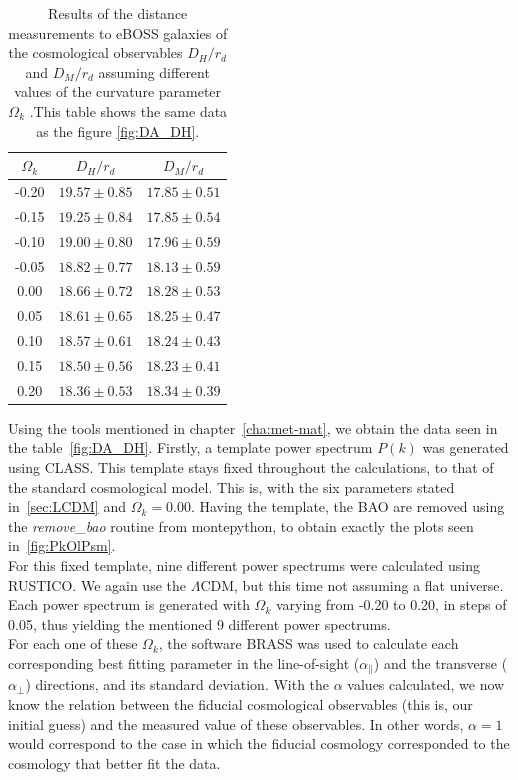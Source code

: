 \begin{table}
	\begin{center}
\begin{tabular}{|c|c|c|}
	\hline
$\Omega_k$ & $D_H/r_d$ & $D_M/r_d$ \\
\hline
-0.20 & $19.57 \pm 0.85$ & $17.85 \pm 0.51$ \\
-0.15 & $19.25 \pm 0.84$ & $17.85 \pm 0.54$ \\
-0.10& $19.00 \pm 0.80$ & $17.96 \pm 0.59$ \\
-0.05 & $18.82 \pm 0.77$ & $18.13 \pm 0.59$ \\
0.00 & $18.66 \pm 0.72$ & $18.28 \pm 0.53$ \\
0.05 & $18.61 \pm 0.65$ & $18.25 \pm 0.47$ \\
0.10 & $18.57 \pm 0.61$ & $18.24 \pm 0.43$ \\
0.15 & $18.50\pm 0.56$ & $18.23 \pm 0.41$ \\
0.20 & $18.36 \pm 0.53$ & $18.34 \pm 0.39$ \\
\hline
\end{tabular}
\end{center}
\caption{Results of the distance measurements to eBOSS galaxies of the cosmological observables $D_H /r_d$ and $D_M /r_d$ assuming different values of the curvature parameter $\Omega_k$ .This table shows the same data as the figure \ref{fig:DA_DH}.}	
\label{tab:DA_DH}
\end{table}
Using the tools mentioned in chapter~\ref{cha:met-mat}, we obtain the data seen in the table~\ref{fig:DA_DH}. Firstly, a template power spectrum $P(k)$ was generated using CLASS. This template stays fixed throughout the calculations, to that of the standard cosmological model. This is, with the six parameters stated in~\ref{sec:LCDM} and $\Omega_k=0.00$. Having the template, the BAO are removed using the \textit{remove\_bao} routine from montepython, to obtain exactly the plots seen in~\ref{fig:PkOlPsm}. \\

For this fixed template, nine different power spectrums were calculated using RUSTICO\@. We again use the $\Lambda$CDM, but this time not assuming a flat universe. Each power spectrum is generated with $\Omega_k$ varying from -0.20 to 0.20, in steps of 0.05, thus yielding the mentioned 9 different power spectrums. \\

For each one of these $\Omega_k$, the software BRASS was used to calculate each corresponding best fitting parameter in the line-of-sight ($\alpha_\parallel$) and the transverse ($\alpha_\perp$) directions, and its standard deviation. With the $\alpha$ values calculated, we now know the relation between the fiducial cosmological observables (this is, our initial guess) and the measured value of these observables. In other words, $\alpha=1$ would correspond to the case in which the fiducial cosmology corresponded to the cosmology that better fit the data.\\

